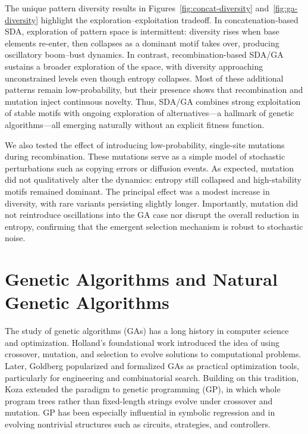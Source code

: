 \documentclass[life,article,submit,pdftex,moreauthors]{Definitions/mdpi}
\begin{document}
The unique pattern diversity results in Figures~\ref{fig:concat-diversity} and~\ref{fig:ga-diversity} highlight the exploration--exploitation tradeoff. 
In concatenation-based SDA, exploration of pattern space is intermittent: 
diversity rises when base elements re-enter, then collapses as a dominant 
motif takes over, producing oscillatory boom--bust dynamics. In contrast, 
recombination-based SDA/GA sustains a broader exploration of the space, 
with diversity approaching unconstrained levels even though entropy 
collapses. Most of these additional patterns remain low-probability, but 
their presence shows that recombination and mutation inject continuous 
novelty. Thus, SDA/GA combines strong exploitation of stable motifs with 
ongoing exploration of alternatives---a hallmark of genetic algorithms---all 
emerging naturally without an explicit fitness function.


We also tested the effect of introducing low-probability, single-site mutations during recombination. 
These mutations serve as a simple model of stochastic perturbations such as copying errors or 
diffusion events. As expected, mutation did not qualitatively alter the dynamics: entropy still 
collapsed and high-stability motifs remained dominant. The principal effect was a modest increase 
in diversity, with rare variants persisting slightly longer. Importantly, mutation did not reintroduce 
oscillations into the GA case nor disrupt the overall reduction in entropy, confirming that the 
emergent selection mechanism is robust to stochastic noise.

\section{Genetic Algorithms and Natural Genetic Algorithms}

The study of genetic algorithms (GAs) has a long history in computer science and optimization. 
Holland’s foundational work \cite{holland1975adaptation} introduced the idea of using crossover, 
mutation, and selection to evolve solutions to computational problems. Later, Goldberg 
\cite{goldberg1989genetic} popularized and formalized GAs as practical optimization tools, 
particularly for engineering and combinatorial search. Building on this tradition, Koza 
\cite{koza1992genetic} extended the paradigm to genetic programming (GP), in which whole 
program trees rather than fixed-length strings evolve under crossover and mutation. GP has 
been especially influential in symbolic regression and in evolving nontrivial structures such 
as circuits, strategies, and controllers.
\end{document}
